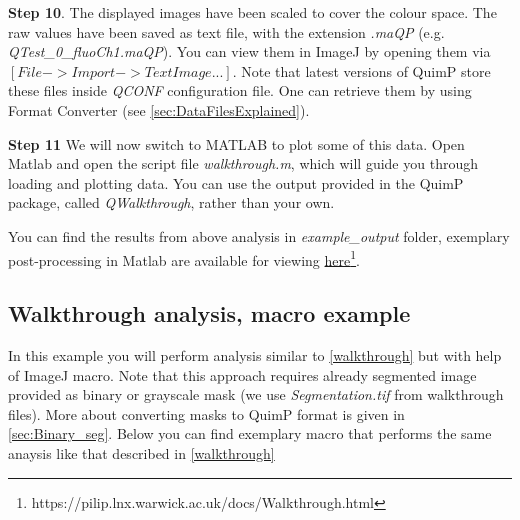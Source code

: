 \documentclass[a4paper,12pt]{article}
\begin{document}
\textbf{Step 10}. The displayed images have been scaled to cover the colour space. The raw values have been saved
as text file, with the extension \emph{.maQP} (e.g.  \textit{QTest\_0\_fluoCh1.maQP}).
You can view them in ImageJ by opening them via $[File -> Import -> Text Image...]$. Note that latest versions of QuimP store these files inside \textit{QCONF} configuration file. One can retrieve them by using Format Converter (see \autoref{sec:DataFilesExplained}).

\textbf{Step 11} We will now switch to MATLAB to plot some of this data.  Open Matlab
and open the script file \textit{walkthrough.m}, which will guide you through loading and plotting data.
You can use the output provided in the QuimP package, called \textit{QWalkthrough}, rather than
your own.

You can find the results from above analysis in \textit{example\_output} folder, exemplary post-processing in Matlab are available for viewing  \href{https://pilip.lnx.warwick.ac.uk/docs/Walkthrough.html}{here}\footnote{https://pilip.lnx.warwick.ac.uk/docs/Walkthrough.html}.

\subsection{Walkthrough analysis, macro example}
\label{sec:walk_macro}
In this example you will perform analysis similar to \autoref{walkthrough} but with help of ImageJ macro. Note that this approach requires already segmented image provided as binary or grayscale mask (we use \textit{Segmentation.tif} from walkthrough files). More about converting masks to QuimP format is given in \autoref{sec:Binary_seg}. Below you can find exemplary macro that performs the same anaysis like that described in \autoref{walkthrough}  
\end{document}
